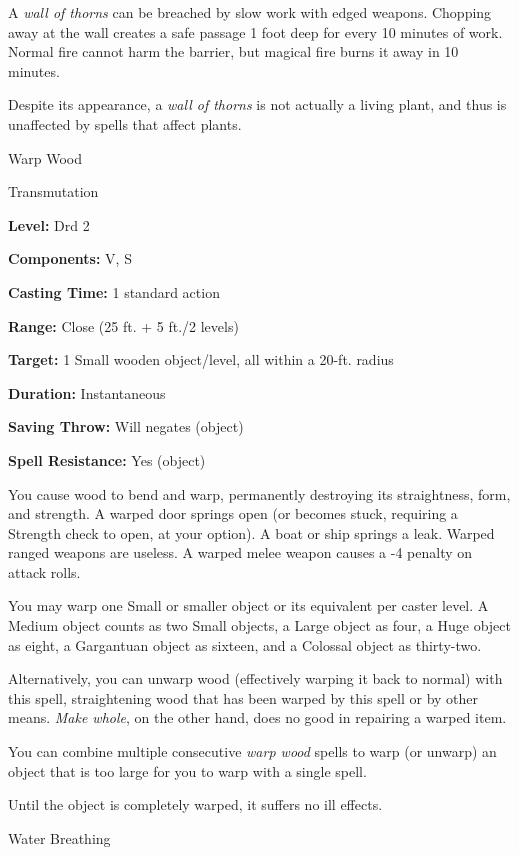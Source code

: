 \documentclass{article}
\begin{document}
A \textit{wall of thorns }can be breached by slow work with edged weapons. Chopping 
away at the wall creates a safe passage 1 foot deep for every 10 minutes of work. 
Normal fire cannot harm the barrier, but magical fire burns it away in 10 minutes.

Despite its appearance, a \textit{wall of thorns }is not actually a living plant, 
and thus is unaffected by spells that affect plants.

\vspace{12pt}
Warp Wood

Transmutation

\textbf{Level:} Drd 2

\textbf{Components:} V, S

\textbf{Casting Time:} 1 standard action

\textbf{Range:} Close (25 ft. + 5 ft./2 levels)

\textbf{Target:} 1 Small wooden object/level, all within a 20-ft. radius

\textbf{Duration:} Instantaneous

\textbf{Saving Throw: }Will negates (object)

\textbf{Spell Resistance:} Yes (object)

You cause wood to bend and warp, permanently destroying its straightness, form, 
and strength. A warped door springs open (or becomes stuck, requiring a Strength 
check to open, at your option). A boat or ship springs a leak. Warped ranged weapons 
are useless. A warped melee weapon causes a -4 penalty on attack rolls.

You may warp one Small or smaller object or its equivalent per caster level. A 
Medium object counts as two Small objects, a Large object as four, a Huge object 
as eight, a Gargantuan object as sixteen, and a Colossal object as thirty-two.

Alternatively, you can unwarp wood (effectively warping it back to normal) with 
this spell, straightening wood that has been warped by this spell or by other means. 
\textit{Make whole}, on the other hand, does no good in repairing a warped item.

You can combine multiple consecutive \textit{warp wood }spells to warp (or unwarp) 
an object that is too large for you to warp with a single spell. 

Until the object is completely warped, it suffers no ill effects.

\vspace{12pt}
Water Breathing
\end{document}
